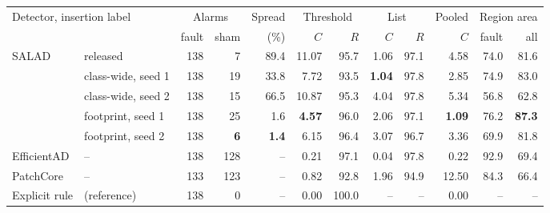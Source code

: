 \begin{tabular}{llrrrrrrrrrr}
\toprule
\multicolumn{2}{l}{Detector, insertion label} & \multicolumn{2}{c}{Alarms} & Spread & \multicolumn{2}{c}{Threshold} & \multicolumn{2}{c}{List} & Pooled & \multicolumn{2}{c}{Region area} \\
\cmidrule(lr){3-4}\cmidrule(lr){6-7}\cmidrule(lr){8-9}\cmidrule(lr){11-12}
 & & fault & sham & (\%) & $C$ & $R$ & $C$ & $R$ & $C$ & fault & all \\
\midrule
SALAD & released & 138 & 7 & 89.4 & 11.07 & 95.7 & 1.06 & 97.1 & 4.58 & 74.0 & 81.6 \\
 & class-wide, seed 1 & 138 & 19 & 33.8 & 7.72 & 93.5 & \textbf{1.04} & 97.8 & 2.85 & 74.9 & 83.0 \\
 & class-wide, seed 2 & 138 & 15 & 66.5 & 10.87 & 95.3 & 4.04 & 97.8 & 5.34 & 56.8 & 62.8 \\
 & footprint, seed 1 & 138 & 25 & 1.6 & \textbf{4.57} & 96.0 & 2.06 & 97.1 & \textbf{1.09} & 76.2 & \textbf{87.3} \\
 & footprint, seed 2 & 138 & \textbf{6} & \textbf{1.4} & 6.15 & 96.4 & 3.07 & 96.7 & 3.36 & 69.9 & 81.8 \\
\midrule
EfficientAD & -- & 138 & 128 & -- & 0.21 & 97.1 & 0.04 & 97.8 & 0.22 & 92.9 & 69.4 \\
PatchCore & -- & 133 & 123 & -- & 0.82 & 92.8 & 1.96 & 94.9 & 12.50 & 84.3 & 66.4 \\
\midrule
Explicit rule & (reference) & 138 & 0 & -- & 0.00 & 100.0 & -- & -- & 0.00 & -- & -- \\
\bottomrule
\end{tabular}

